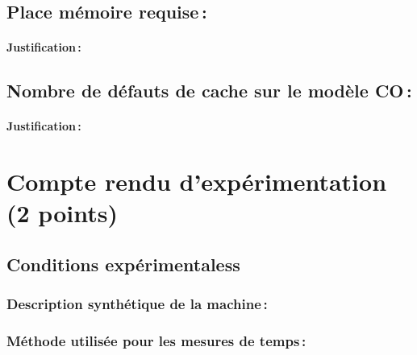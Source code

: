 \documentclass[a4paper, 10pt, french]{article}
\begin{document}
  \subsection{Place mémoire requise\,: }
    \paragraph{Justification\,: }

  \subsection{Nombre de défauts de cache sur le modèle CO\,: }
    \paragraph{Justification\,: }


\section{Compte rendu d'expérimentation (2 points)}
  \subsection{Conditions expérimentaless}

    \subsubsection{Description synthétique de la machine\,:} 

    \subsubsection{Méthode utilisée pour les mesures de temps\,: } 
\end{document}
